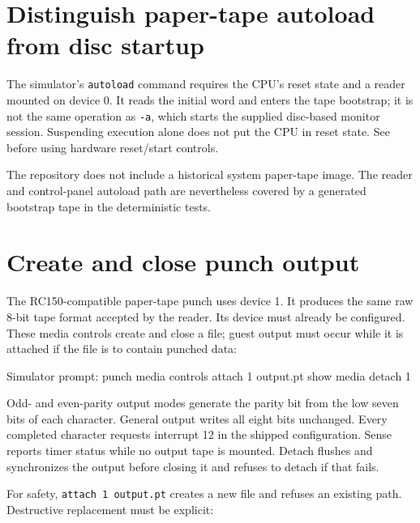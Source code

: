 \section{Distinguish paper-tape autoload from disc startup}\label{distinguish-paper-tape-autoload-from-disc-startup}

The simulator's \passthrough{\lstinline!autoload!} command requires the CPU's reset state and a reader mounted on device 0. It reads the initial word and enters the tape bootstrap; it is not the same operation as \passthrough{\lstinline!-a!}, which starts the supplied disc-based monitor session. Suspending execution alone does not put the CPU in reset state. See  before using hardware reset/start controls.

The repository does not include a historical system paper-tape image. The reader and control-panel autoload path are nevertheless covered by a generated bootstrap tape in the deterministic tests.

\section{Create and close punch output}\label{create-and-close-punch-output}

The RC150-compatible paper-tape punch uses device 1. It produces the same raw 8-bit tape format accepted by the reader. Its device must already be configured. These media controls create and close a file; guest output must occur while it is attached if the file is to contain punched data:

\begin{commandexample}{Simulator prompt: punch media controls}
attach 1 output.pt
show media
detach 1
\end{commandexample}

Odd- and even-parity output modes generate the parity bit from the low seven bits of each character. General output writes all eight bits unchanged. Every completed character requests interrupt 12 in the shipped configuration. Sense reports timer status while no output tape is mounted. Detach flushes and synchronizes the output before closing it and refuses to detach if that fails.

For safety, \passthrough{\lstinline!attach 1 output.pt!} creates a new file and refuses an existing path. Destructive replacement must be explicit:


